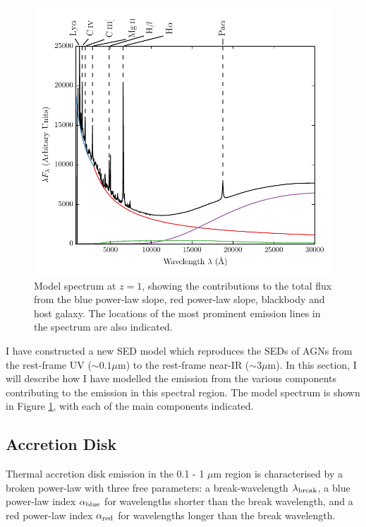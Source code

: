 \begin{figure}
  \centering
  \includegraphics[width=\textwidth]{figures/chapter05/sed_model.pdf}
  \caption{Model spectrum at $z=1$, showing the contributions to the total flux from the blue power-law slope, red power-law slope, blackbody and host galaxy. The locations of the most prominent emission lines in the spectrum are also indicated. }
  \label{fig:modelsed}
\end{figure}

I have constructed a new SED model which reproduces the SEDs of AGNs from the rest-frame UV ($\sim 0.1 \mu$m) to the rest-frame near-IR ($\sim 3 \mu$m). 
In this section, I will describe how I have modelled the emission from the various components contributing to the emission in this spectral region. 
The model spectrum is shown in Figure \ref{fig:modelsed}, with each of the main components indicated. 

\subsection{Accretion Disk}

Thermal accretion disk emission in the 0.1 - 1 $\mu$m region is characterised by a broken power-law with three free parameters: a break-wavelength $\lambda_{\rm break}$, a blue power-law index $\alpha_{\rm blue}$ for wavelengths shorter than the break wavelength, and a red power-law index $\alpha_{\rm red}$ for wavelengths longer than the break wavelength.

